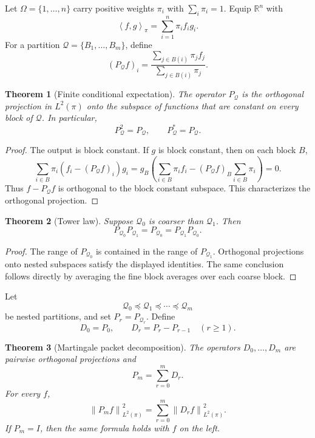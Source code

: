 \documentclass{aomart}
\newtheorem{theorem}{Theorem}[section]
\theoremstyle{definition}
\theoremstyle{remark}
\newcommand{\RR}{\mathbb R}
\newcommand{\Qcal}{\mathcal Q}
\newcommand{\norm}[1]{\left\lVert#1\right\rVert}
\newcommand{\ip}[2]{\left\langle#1,#2\right\rangle}
\begin{document}
Let \(\Omega=\{1,\ldots,n\}\) carry positive weights \(\pi_i\) with \(\sum_i\pi_i=1\). Equip \(\RR^n\) with
\[
\ip{f}{g}_\pi
=
\sum_{i=1}^n\pi_if_ig_i.
\]
For a partition \(\Qcal=\{B_1,\ldots,B_m\}\), define
\[
(P_\Qcal f)_i
=
\frac{\sum_{j\in B(i)}\pi_jf_j}
{\sum_{j\in B(i)}\pi_j}.
\]

\begin{theorem}[Finite conditional expectation]\label{thm:finite_conditional_expectation}
The operator \(P_\Qcal\) is the orthogonal projection in \(L^2(\pi)\) onto the subspace of functions that are constant on every block of \(\Qcal\). In particular,
\[
P_\Qcal^2=P_\Qcal,
\qquad
P_\Qcal^*=P_\Qcal.
\]
\end{theorem}

\begin{proof}
The output is block constant. If \(g\) is block constant, then on each block \(B\),
\[
\sum_{i\in B}\pi_i(f_i-(P_\Qcal f)_i)g_i
=g_B\left(
\sum_{i\in B}\pi_if_i
-(P_\Qcal f)_B\sum_{i\in B}\pi_i
\right)=0.
\]
Thus \(f-P_\Qcal f\) is orthogonal to the block constant subspace. This characterizes the orthogonal projection.
\end{proof}

\begin{theorem}[Tower law]\label{thm:tower_law}
Suppose \(\Qcal_0\) is coarser than \(\Qcal_1\). Then
\[
P_{\Qcal_0}P_{\Qcal_1}
=P_{\Qcal_0}
=P_{\Qcal_1}P_{\Qcal_0}.
\]
\end{theorem}

\begin{proof}
The range of \(P_{\Qcal_0}\) is contained in the range of \(P_{\Qcal_1}\). Orthogonal projections onto nested subspaces satisfy the displayed identities. The same conclusion follows directly by averaging the fine block averages over each coarse block.
\end{proof}

Let
\[
\Qcal_0\preceq\Qcal_1\preceq\cdots\preceq\Qcal_m
\]
be nested partitions, and set \(P_r=P_{\Qcal_r}\). Define
\[
D_0=P_0,
\qquad
D_r=P_r-P_{r-1}
\quad(r\geq1).
\]

\begin{theorem}[Martingale packet decomposition]\label{thm:martingale_packets}
The operators \(D_0,\ldots,D_m\) are pairwise orthogonal projections and
\[
P_m=\sum_{r=0}^mD_r.
\]
For every \(f\),
\[
\boxed{
\norm{P_mf}_{L^2(\pi)}^2
=
\sum_{r=0}^m\norm{D_rf}_{L^2(\pi)}^2.
}
\]
If \(P_m=I\), then the same formula holds with \(f\) on the left.
\end{theorem}
\end{document}

